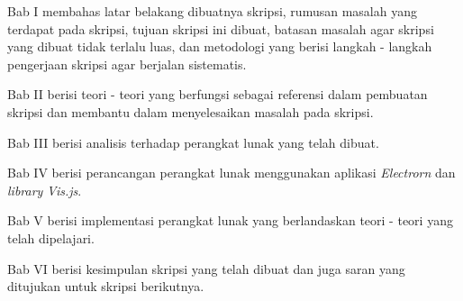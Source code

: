 Bab I membahas latar belakang dibuatnya skripsi, rumusan masalah yang terdapat pada skripsi, tujuan skripsi ini dibuat, batasan masalah agar skripsi yang dibuat tidak terlalu luas, dan metodologi yang berisi langkah - langkah pengerjaan skripsi agar berjalan sistematis.

Bab II berisi teori - teori yang berfungsi sebagai referensi dalam pembuatan skripsi dan membantu dalam menyelesaikan masalah pada skripsi.

Bab III berisi analisis terhadap perangkat lunak yang telah dibuat.

Bab IV berisi perancangan perangkat lunak menggunakan aplikasi \textit{Electrorn} dan \textit{library} \textit{Vis.js}.

Bab V berisi implementasi perangkat lunak yang berlandaskan teori - teori yang telah dipelajari.

Bab VI berisi kesimpulan skripsi yang telah dibuat dan juga saran yang ditujukan untuk skripsi berikutnya.

